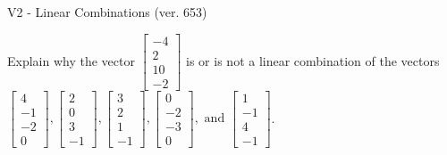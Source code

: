 \begin{exercise}
  \begin{exerciseTitle}V2 - Linear Combinations (ver. 653)\end{exerciseTitle}
  \begin{exerciseStatement}
    Explain why the vector \(\left[\begin{array}{c}
-4 \\
2 \\
10 \\
-2
\end{array}\right]\)  is or is not a linear 
	combination of the vectors \(\left[\begin{array}{c}
4 \\
-1 \\
-2 \\
0
\end{array}\right] , \left[\begin{array}{c}
2 \\
0 \\
3 \\
-1
\end{array}\right] , \left[\begin{array}{c}
3 \\
2 \\
1 \\
-1
\end{array}\right] , \left[\begin{array}{c}
0 \\
-2 \\
-3 \\
0
\end{array}\right] , \text{ and } \left[\begin{array}{c}
1 \\
-1 \\
4 \\
-1
\end{array}\right]\).
	



\end{exerciseStatement}
\end{exercise}
